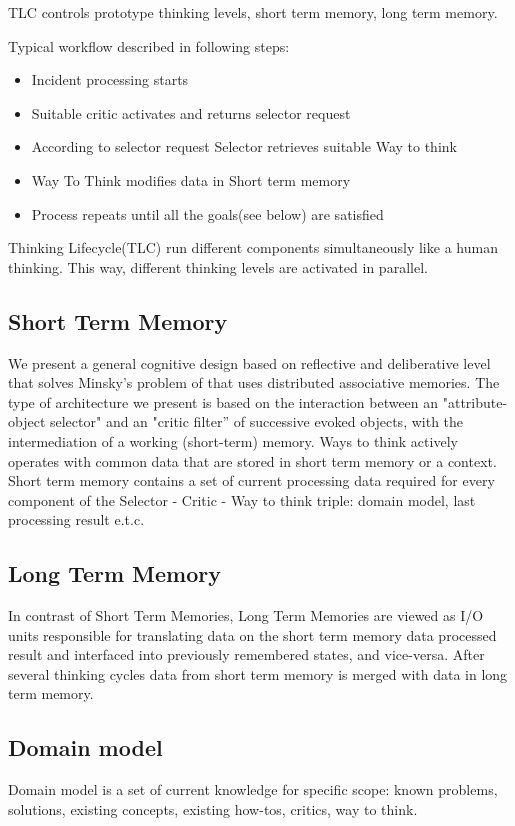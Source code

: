 \documentclass[runningheads,a4paper]{llncs}
\begin{document}
\begin{enumerate}
TLC controls prototype thinking levels, short term memory, long term memory.

Typical workflow described in following steps:
\begin{itemize}
 \item Incident processing starts
 \item Suitable critic activates and returns selector request
 \item According to selector request Selector retrieves suitable Way to think
 \item Way To Think modifies data in Short term memory
 \item Process repeats until all the goals(see below) are satisfied
\end{itemize}

Thinking Lifecycle(TLC) run different components simultaneously like a human thinking. This way, different thinking levels are activated in parallel.

\subsection{Short Term Memory}
We present a general cognitive design based on reflective and deliberative level that solves Minsky's problem of  that uses distributed associative memories. The type of architecture we present is based on the interaction between an "attribute-object selector" and an "critic filter” of successive evoked objects, with the intermediation of a working (short-term) memory.
Ways to think actively operates with common data that are stored in short term memory or a context. Short term memory contains a set of current processing data required for every component of the Selector -\> Critic -\> Way to think triple: domain model, last processing result e.t.c.

\subsection{Long Term Memory}
In contrast of Short Term Memories, Long Term Memories are viewed as I/O units responsible for translating data on the short term memory data processed result and interfaced into previously remembered states, and vice-versa. After several thinking cycles data from short term memory is merged with data in long term memory.

\subsection{Domain model}
Domain model is a set of current knowledge for specific scope: known problems, solutions, existing concepts, existing how-tos, critics, way to think.\\


\end{enumerate}
\end{document}
